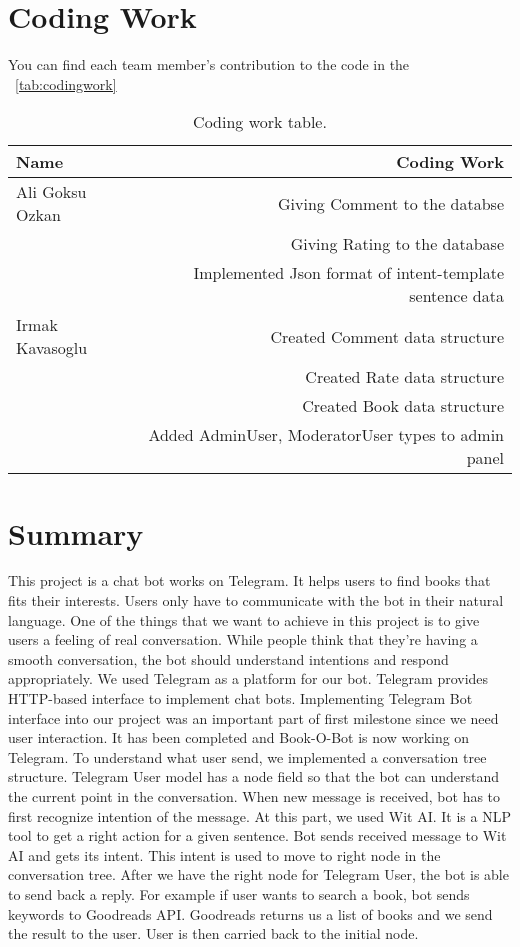 \documentclass[a4paper]{article}
\begin{document}
\section{Coding Work}
You can find each team member's contribution to the code in the ~\autoref{tab:codingwork}

\begin{table}[!hb]
\centering
\begin{tabular}{l|r}
Name & Coding Work \\\hline
Ali Goksu Ozkan & Giving Comment to the databse \\
& Giving Rating to the database \\
& Implemented Json format of intent-template sentence data \\\hline
Irmak Kavasoglu & Created Comment data structure \\
& Created Rate data structure \\
& Created Book data structure \\
& Added AdminUser, ModeratorUser types to admin panel
\end{tabular}
\caption{\label{tab:codingwork}Coding work table.}
\end{table}

\section{Summary}
This project is a chat bot works on Telegram. It helps users to find books that fits their interests.
Users only have to communicate with the bot in their natural language. One of the things that we
want to achieve in this project is to give users a feeling of real conversation. While people think
that they’re having a smooth conversation, the bot should understand intentions and respond
appropriately.
We used Telegram as a platform for our bot. Telegram provides HTTP-based interface to
implement chat bots. Implementing Telegram Bot interface into our project was an important
part of first milestone since we need user interaction. It has been completed and Book-O-Bot is
now working on Telegram.
To understand what user send, we implemented a conversation tree structure. Telegram User
model has a node field so that the bot can understand the current point in the conversation. When
new message is received, bot has to first recognize intention of the message. At this part, we used
Wit AI. It is a NLP tool to get a right action for a given sentence. Bot sends received message to
Wit AI and gets its intent. This intent is used to move to right node in the conversation tree.
After we have the right node for Telegram User, the bot is able to send back a reply. For
example if user wants to search a book, bot sends keywords to Goodreads API.
Goodreads returns us a list of books and we send the result to the user. User is then carried
back to the initial node.
\end{document}
